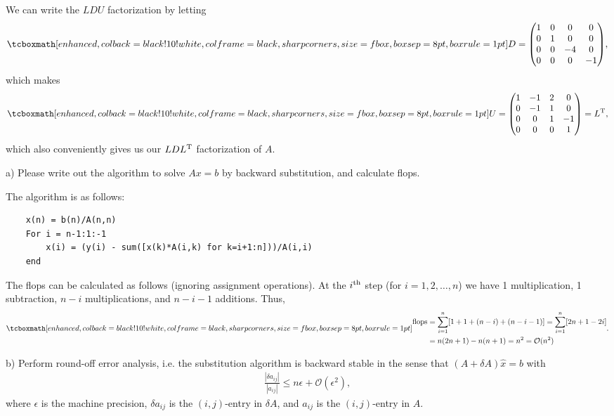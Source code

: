 We can write the $LDU$ factorization by letting
\begin{eqnarray}
    \label{eq:D-mat}
    \eqbox{
    D = 
    \begin{pmatrix}
        1 & 0 & 0 & 0 \\
        0 & 1 & 0 & 0 \\
        0 & 0 & -4 & 0 \\
        0 & 0 & 0 & -1
    \end{pmatrix}
}
,\end{eqnarray}
which makes
\begin{eqnarray}
    \label{eq:U-D}
    \eqbox{
    U =
    \begin{pmatrix}
        1 & -1 & 2 & 0 \\
        0 & -1 & 1 & 0 \\
        0 & 0 & 1 & -1 \\
        0 & 0 & 0 & 1
    \end{pmatrix}
    = L^{\rm T}
}
,\end{eqnarray}
which also conveniently gives us our $LDL^{\rm T}$ factorization of $A$.



a) Please write out the algorithm to solve $Ax = b$ by backward substitution, and calculate flops.

The algorithm is as follows:
\begin{verbatim}
    x(n) = b(n)/A(n,n) 
    For i = n-1:1:-1
        x(i) = (y(i) - sum([x(k)*A(i,k) for k=i+1:n]))/A(i,i)
    end
\end{verbatim}
The flops can be calculated as follows (ignoring assignment operations).
At the $i^{\rm th}$ step (for $i = 1, 2, \ldots, n$) we have 1 multiplication, 1 subtraction, $n-i$ multiplications, and $n-i-1$ additions.
Thus,
\begin{align}
    \label{eq:flops-backward}
    \eqbox{
    \begin{aligned}
    {\rm flops} &= \sum_{i=1}^{n} [1 + 1 + (n-i) + (n-i-1)] = \sum_{i=1}^{n} [2n + 1 - 2i] \\
                &= n(2n+1) - n(n+1) = n^2 = \mathcal{O}(n^2)
    \end{aligned}
}
.\end{align}


b) Perform round-off error analysis, i.e. the substitution algorithm is backward stable in the sense that $(A + \delta A) \hat{x} = b$ with
\begin{eqnarray}
    \label{eq:error}
    \frac{|\delta a_{ij}|}{|a_{ij}|} \leq n \epsilon + \mathcal{O}(\epsilon^2)
,\end{eqnarray}
where $\epsilon$ is the machine precision, $\delta a_{ij}$  is the $(i,j)$-entry in $\delta A$, and $a_{ij}$ is the $(i,j)$-entry in $A$.

